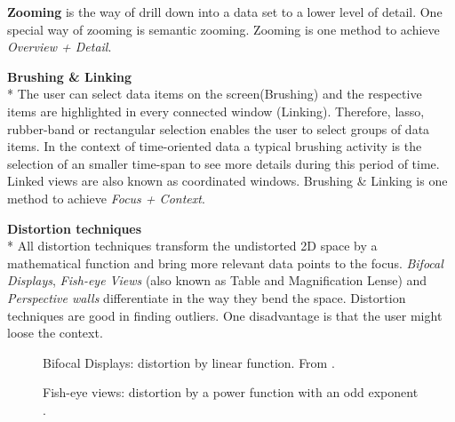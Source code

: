 \textbf{Zooming} is the way of drill down into a data set to a lower level of detail. One special way of zooming is semantic zooming\cite{boulos2003use}. Zooming is one method to achieve \textit{Overview + Detail}.

\textbf{Brushing \& Linking}\\*
The user can select data items on the screen(Brushing) and the respective items are highlighted in every connected window (Linking). Therefore, lasso, rubber-band or rectangular selection enables the user to select groups of data items\cite{tegarden1999, Aigner2011}. In the context of time-oriented data a typical brushing activity is the selection of an smaller time-span to see more details during this period of time. Linked views are also known as coordinated windows.
Brushing \& Linking is one method to achieve \textit{Focus + Context}.

\textbf{Distortion techniques}\\*
All distortion techniques transform the undistorted 2D space by a mathematical function and bring more relevant data points to the focus. \textit{Bifocal Displays}, \textit{Fish-eye Views} (also known as Table and Magnification Lense) and \textit{Perspective walls} differentiate in the way they bend the space. Distortion techniques are good in finding outliers. One disadvantage is that the user might loose the context.
\begin{figure}[H]
    \centering
    \caption{Bifocal Displays: distortion by linear function. From \cite{Stroe1999}.}
    \label{fig:bifocal}
\end{figure}

\begin{figure}[H]
    \centering
    \caption{Fish-eye views:  distortion by a power function with an odd exponent \cite{Stroe1999}.}
    \label{fig:fisheye}
\end{figure}

